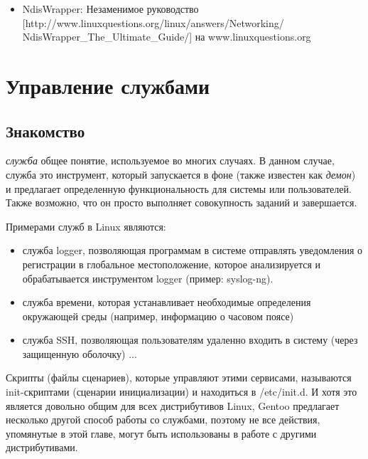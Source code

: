 \documentclass[10pt]{book}
\begin{document}
\newpage

\phantom{}
\begin{tcolorbox}[title=\textbf{Дальнейшие ресурсы}, colback=yellow!14!white, colframe=red!75!blue]
\begin{itemize}
\item NdisWrapper: Незаменимое руководство [http://www.linuxquestions.org/linux/answers/Networking/
NdisWrapper\_The\_Ultimate\_Guide/] на www.linuxquestions.org
\end{itemize}
\end{tcolorbox}

\newpage

\pagestyle{headings} 

\chapter{Управление службами}

\section{Знакомство}

\textit{служба} \textendash{} общее понятие, используемое во многих
случаях. В данном случае, служба \textendash{} это инструмент, который
запускается в фоне (также известен как \textit{демон}) и предлагает
определенную функциональность для системы или пользователей. Также
возможно, что он просто выполняет совокупность заданий и завершается.

Примерами служб в Linux являются:
\begin{itemize}
\item служба logger, позволяющая программам в системе отправлять уведомления
о регистрации в глобальное местоположение, которое анализируется и
обрабатывается инструментом logger (пример: syslog-ng). 
\item служба времени, которая устанавливает необходимые определения окружающей
среды (например, информацию о часовом поясе) 
\item служба SSH, позволяющая пользователям удаленно входить в систему (через
защищенную оболочку) ... 
\end{itemize}
Скрипты (файлы сценариев), которые управляют этими сервисами, называются
init-скриптами (сценарии инициализации) и находиться в /etc/init.d.
И хотя это является довольно общим для всех дистрибутивов Linux, Gentoo
предлагает несколько другой способ работы со службами, поэтому не
все действия, упомянутые в этой главе, могут быть использованы в работе
с другими дистрибутивами.
\end{document}
